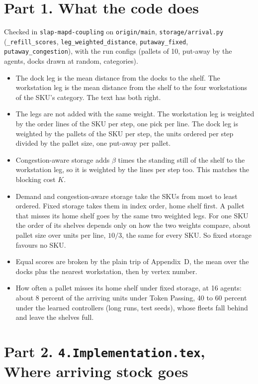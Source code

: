 \documentclass[11pt,a4paper]{article}
\begin{document}
\section*{Part 1. What the code does}
Checked in \texttt{slap-mapd-coupling} on \texttt{origin/main},
\texttt{storage/arrival.py} (\texttt{\_refill\_scores},
\texttt{leg\_weighted\_distance}, \texttt{putaway\_fixed},
\texttt{putaway\_congestion}), with the run configs (pallets of 10,
put-away by the agents, docks drawn at random, categories).
\begin{itemize}[nosep]
  \item The dock leg is the mean distance from the docks to the shelf. The
        workstation leg is the mean distance from the shelf to the four
        workstations of the SKU's category. The text has both right.
  \item The legs are not added with the same weight. The workstation leg is
        weighted by the order lines of the SKU per step, one pick per line.
        The dock leg is weighted by the pallets of the SKU per step, the units
        ordered per step divided by the pallet size, one put-away per pallet.
  \item Congestion-aware storage adds $\beta$ times the standing still of the
        shelf to the workstation leg, so it is weighted by the lines per step
        too. This matches the blocking cost $K$.
  \item Demand and congestion-aware storage take the SKUs from most to least
        ordered. Fixed storage takes them in index order, home shelf first.
        A pallet that misses its home shelf goes by the same two weighted
        legs. For one SKU the order of its shelves depends only on how the
        two weights compare, about pallet size over units per line, $10/3$,
        the same for every SKU. So fixed storage favours no SKU.
  \item Equal scores are broken by the plain trip of Appendix~D, the mean
        over the docks plus the nearest workstation, then by vertex number.
  \item How often a pallet misses its home shelf under fixed storage, at 16
        agents: about 8 percent of the arriving units under Token Passing, 40
        to 60 percent under the learned controllers (long runs, test seeds),
        whose fleets fall behind and leave the shelves full.
\end{itemize}

\section*{Part 2. \texttt{4.Implementation.tex}, Where arriving stock goes}
\end{document}
